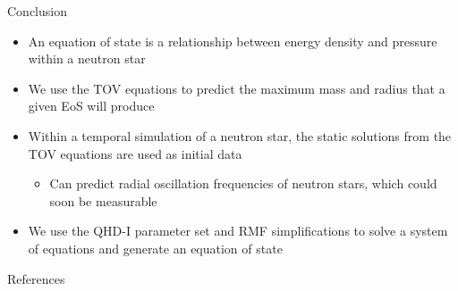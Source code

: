 \documentclass[handout]{beamer}
\begin{document}
    \begin{frame}{Conclusion}
        \begin{itemize}
            \item An equation of state is a relationship between energy density and pressure within a neutron star \pause
            \item We use the TOV equations to predict the maximum mass and radius that a given EoS will produce \pause
            \item Within a temporal simulation of a neutron star, the static solutions from the TOV equations are used as initial data \begin{itemize}
                \item Can predict radial oscillation frequencies of neutron stars, which could soon be measurable
            \end{itemize}
            \item We use the QHD-I parameter set and RMF simplifications to solve a system of equations and generate an equation of state
        \end{itemize}
    \end{frame}

    \begin{frame}[allowframebreaks]{References}
        \nocite{*}
        \printbibliography
    \end{frame}
\end{document}
